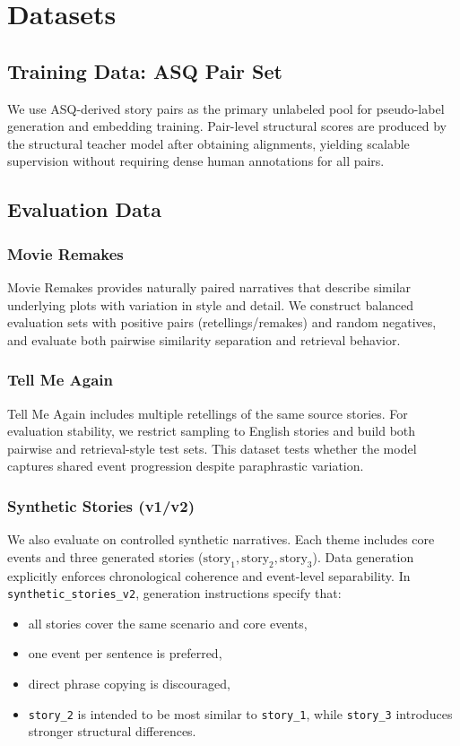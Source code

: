 \section{Datasets}

\subsection{Training Data: ASQ Pair Set}

We use ASQ-derived story pairs as the primary unlabeled pool for pseudo-label generation and embedding training. Pair-level structural scores are produced by the structural teacher model after obtaining alignments, yielding scalable supervision without requiring dense human annotations for all pairs.

\subsection{Evaluation Data}

\subsubsection{Movie Remakes}

Movie Remakes provides naturally paired narratives that describe similar underlying plots with variation in style and detail. We construct balanced evaluation sets with positive pairs (retellings/remakes) and random negatives, and evaluate both pairwise similarity separation and retrieval behavior.

\subsubsection{Tell Me Again}

Tell Me Again includes multiple retellings of the same source stories. For evaluation stability, we restrict sampling to English stories and build both pairwise and retrieval-style test sets. This dataset tests whether the model captures shared event progression despite paraphrastic variation.

\subsubsection{Synthetic Stories (v1/v2)}

We also evaluate on controlled synthetic narratives. Each theme includes core events and three generated stories ($\text{story}_1,\text{story}_2,\text{story}_3$). Data generation explicitly enforces chronological coherence and event-level separability. In \texttt{synthetic\_stories\_v2}, generation instructions specify that:
\begin{itemize}
    \item all stories cover the same scenario and core events,
    \item one event per sentence is preferred,
    \item direct phrase copying is discouraged,
    \item \texttt{story\_2} is intended to be most similar to \texttt{story\_1}, while \texttt{story\_3} introduces stronger structural differences.
\end{itemize}

